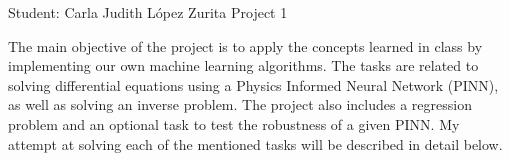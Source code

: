 \documentclass[unicode,11pt,a4paper,oneside,numbers=endperiod,openany]{scrartcl}
\begin{document}
\setassignment
{}

            {Student: Carla Judith L\'opez Zurita}
            {}{Project 1}{}
\newline

The main objective of the project is to apply the concepts learned in class by
implementing our own machine learning algorithms. The tasks
are related to solving differential equations using a Physics Informed Neural
Network (PINN), as well as solving an inverse problem. The project also includes 
a regression problem and an optional task to test the robustness of a given PINN.
My attempt at solving each of the mentioned tasks will be described in detail below.
\end{document}

